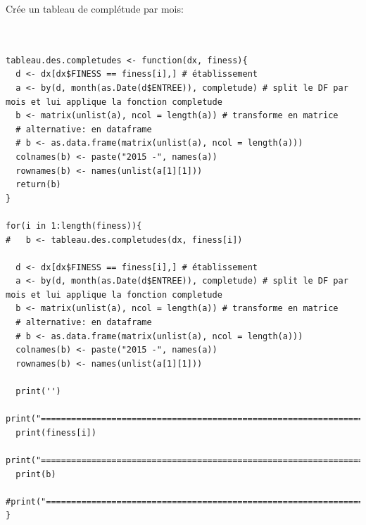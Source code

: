 \documentclass[]{article}
\begin{document}
Crée un tableau de complétude par mois:

\begin{verbatim}


tableau.des.completudes <- function(dx, finess){
  d <- dx[dx$FINESS == finess[i],] # établissement
  a <- by(d, month(as.Date(d$ENTREE)), completude) # split le DF par mois et lui applique la fonction completude
  b <- matrix(unlist(a), ncol = length(a)) # transforme en matrice
  # alternative: en dataframe
  # b <- as.data.frame(matrix(unlist(a), ncol = length(a)))
  colnames(b) <- paste("2015 -", names(a))
  rownames(b) <- names(unlist(a[1][1]))
  return(b)
}

for(i in 1:length(finess)){
#   b <- tableau.des.completudes(dx, finess[i])
  
  d <- dx[dx$FINESS == finess[i],] # établissement
  a <- by(d, month(as.Date(d$ENTREE)), completude) # split le DF par mois et lui applique la fonction completude
  b <- matrix(unlist(a), ncol = length(a)) # transforme en matrice
  # alternative: en dataframe
  # b <- as.data.frame(matrix(unlist(a), ncol = length(a)))
  colnames(b) <- paste("2015 -", names(a))
  rownames(b) <- names(unlist(a[1][1]))
  
  print('')
  print("=====================================================================")
  print(finess[i])
  print("=====================================================================")
  print(b)
  #print("=====================================================================")
}
\end{verbatim}
\end{document}
